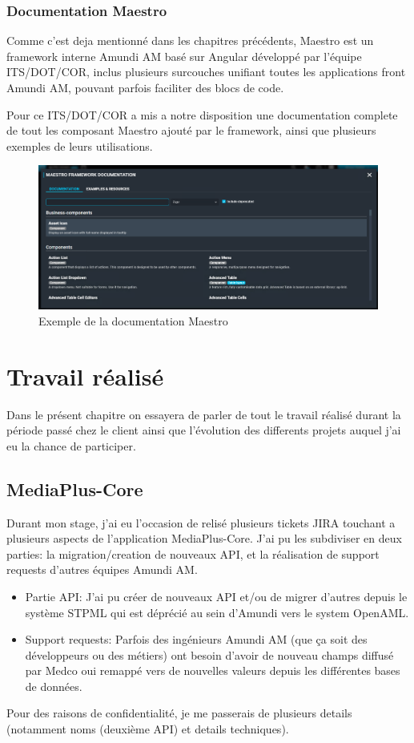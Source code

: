 \subsection{Documentation Maestro}
\par Comme c'est deja mentionné dans les chapitres précédents, Maestro est un framework interne Amundi AM basé sur Angular développé par l'équipe ITS/DOT/COR, inclus plusieurs surcouches unifiant toutes les applications front Amundi AM, pouvant parfois faciliter des blocs de code.
\par Pour ce ITS/DOT/COR a mis a notre disposition une documentation complete de tout les composant Maestro ajouté par le framework, ainsi que plusieurs exemples de leurs utilisations.
\begin{figure}[ht]
    \centering
    \includegraphics[width=\columnwidth]{img/maestrodocum.png}
    \caption{Exemple de la documentation Maestro}
\end{figure} 

\chapter{Travail réalisé}
\par Dans le présent chapitre on essayera de parler de tout le travail réalisé durant la période passé chez le client ainsi que l'évolution des differents projets auquel j'ai eu la chance de participer.
\section{MediaPlus-Core}
\par Durant mon stage, j'ai eu l'occasion de relisé plusieurs tickets JIRA touchant a plusieurs aspects de l'application MediaPlus-Core. J'ai pu les subdiviser en deux parties: la migration/creation de nouveaux API, et la réalisation de support requests d'autres équipes Amundi AM.
\begin{itemize}
    \item Partie API: J'ai pu créer de nouveaux API et/ou de migrer d'autres depuis le système STPML qui est déprécié au sein d'Amundi vers le system OpenAML.
    \item Support requests: Parfois des ingénieurs Amundi AM (que ça soit des développeurs ou des métiers) ont besoin d'avoir de nouveau champs diffusé par Medco oui remappé vers de nouvelles valeurs depuis les différentes bases de données. 
\end{itemize} 
\par Pour des raisons de confidentialité, je me passerais de plusieurs details (notamment noms (deuxième API) et details techniques).
